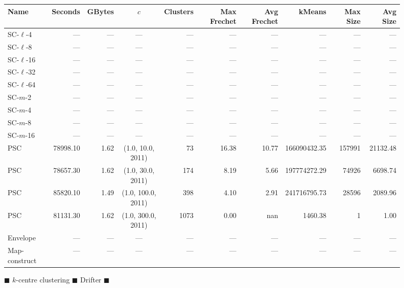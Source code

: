 
    \begin{figure} \begin{center}
        \begin{minipage}{\textwidth}
    {
    \begin{tabular}{@{}lrrcrrrrrr@{}}
        \toprule
        Name & Seconds & GBytes & $c$ & Clusters & Max Frechet & Avg Frechet & kMeans & Max Size & Avg Size\\
        \midrule
                        SC-$\ell$-4 & --- & --- & --- & --- & --- & --- & --- & --- & ---\\
SC-$\ell$-8 & --- & --- & --- & --- & --- & --- & --- & --- & ---\\
SC-$\ell$-16 & --- & --- & --- & --- & --- & --- & --- & --- & ---\\
SC-$\ell$-32& --- & --- & --- & --- & --- & --- & --- & --- & ---\\
SC-$\ell$-64 & --- & --- & --- & --- & --- & --- & --- & --- & ---\\
SC-$m$-2 & --- & --- & --- & --- & --- & --- & --- & --- & ---\\
SC-$m$-4 & --- & --- & --- & --- & --- & --- & --- & --- & ---\\
SC-$m$-8 & --- & --- & --- & --- & --- & --- & --- & --- & ---\\
SC-$m$-16 & --- & --- & --- & --- & --- & --- & --- & --- & ---\\
        PSC & 78998.10 & 1.62 & (1.0, 10.0, 2011) & 73 & 16.38 & 10.77 & 166090432.35 & 157991 & 21132.48\\
PSC & 78657.30 & 1.62 & (1.0, 30.0, 2011) & 174 & 8.19 & 5.66 & 197774272.29 & 74926 & 6698.74\\
PSC & 85820.10 & 1.49 & (1.0, 100.0, 2011) & 398 & 4.10 & 2.91 & 241716795.73 & 28596 & 2089.96\\
PSC & 81131.30 & 1.62 & (1.0, 300.0, 2011) & 1073 & 0.00 & nan & 1460.38 & 1 & 1.00\\
        Envelope & --- & --- & --- & --- & --- & --- & --- & --- & ---\\
Map-construct & --- & --- & --- & --- & --- & --- & --- & --- & ---\\
        \bottomrule
    \end{tabular}
    }
\end{minipage}
\end{center}
        \caption{$\blacksquare$ $k$-centre clustering $\blacksquare$ Drifter $\blacksquare$}
 \end{figure}
